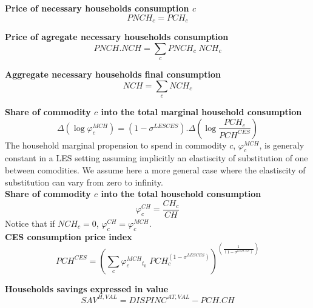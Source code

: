 \documentclass[12pt]{article}
\numberwithin{equation}{section}
\begin{document}
\noindent \textbf{Price of necessary households consumption $c$} 
\begin{dmath}
PNCH_{c} = PCH_{c}
\label{consumer.mdlPNCH[c]}
\end{dmath}

\noindent \textbf{Price of agregate necessary households consumption} 
\begin{dmath}
PNCH . NCH = \sum_{c} PNCH_{c} \; NCH_{c}
\label{consumer.mdlPNCH}
\end{dmath}

\noindent \textbf{Aggregate necessary households final consumption} 
\begin{dmath}
NCH = \sum_{c} NCH_{c}
\label{consumer.mdlNCH}
\end{dmath}

\noindent \textbf{Share of commodity $c$ into the total marginal household consumption} 
\begin{dmath}
\varDelta \left(\operatorname{log} \varphi^{MCH}_{c}\right) = \left( 1 - \sigma^{LESCES} \right) . \varDelta \left(\operatorname{log} \frac{PCH_{c}}{PCH^{CES}}\right)
\label{consumer.mdlphi_MCH[c]}
\end{dmath}
The household marginal propension to spend in commodity $c$, $\varphi^{MCH}_{c}$, is generaly constant in a LES setting assuming implicitly an elastiscity of substitution of one between comodities. We assume here a more general case where the elastiscity of substitution can vary from zero to infinity. \\

\noindent \textbf{Share of commodity $c$ into the total household consumption} 
\begin{dmath}
\varphi^{CH}_{c} = \frac{CH_{c}}{CH}
\label{consumer.mdlPhi_CH[c]}
\end{dmath}
Notice that if $NCH_{c} = 0$, $\varphi^{CH}_{c} = \varphi^{MCH}_{c}$.\\

\noindent \textbf{CES consumption price index} 
\begin{dmath}
PCH^{CES} = \left( \sum_{c} \varphi^{MCH}_{c}_{t_0} \; PCH_{c} ^ {\left( 1 - \sigma^{LESCES} \right)} \right) ^ {\left( \frac{1}{\left( 1 - \sigma^{LESCES} \right)} \right)}
\label{consumer.mdlPCH_CES}
\end{dmath}

\noindent \textbf{Households savings expressed in value} 
\begin{dmath}
SAV^{H,VAL} = DISPINC^{AT,VAL} - PCH . CH
\label{consumer.mdlSAV_H_VAL}
\end{dmath}
\end{document}
